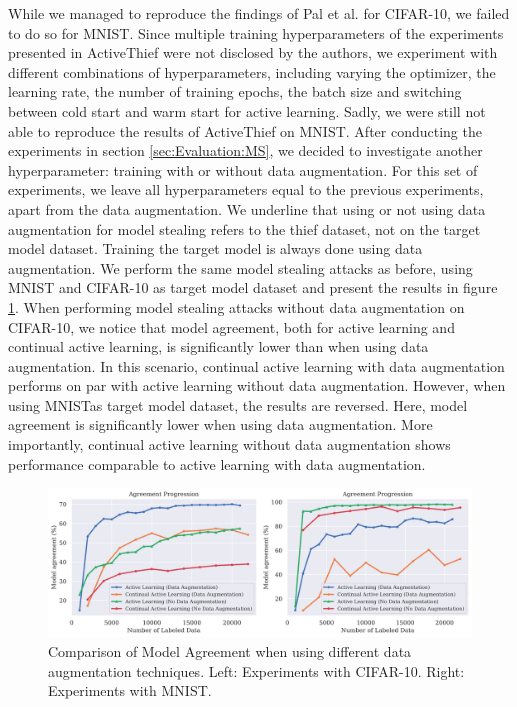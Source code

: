 While we managed to reproduce the findings of Pal et al. for CIFAR-10, we failed to do so for MNIST. Since multiple training hyperparameters of the experiments
presented in ActiveThief were not disclosed by the authors, we experiment with different combinations of hyperparameters, including varying the optimizer,
the learning rate, the number of training epochs, the batch size and switching between cold start and warm start for active learning. Sadly, we were still
not able to reproduce the results of ActiveThief on MNIST. After conducting the experiments in section \ref{sec:Evaluation:MS}, we decided to investigate
another hyperparameter: training with or without data augmentation. For this set of experiments, we leave all hyperparameters equal to the previous experiments,
apart from the data augmentation. We underline that using or not using data augmentation for model stealing refers to the thief dataset, not on the target
model dataset. Training the target model is always done using data augmentation. We perform the same model stealing attacks as before, using MNIST and
CIFAR-10 as target model dataset and present the results in figure \ref{fig:Evaluation:Results:CAL:EffectAugmentation}. When performing model stealing attacks
without data augmentation on CIFAR-10, we notice that model agreement, both for active learning and continual active learning, is significantly lower than
when using data augmentation. In this scenario, continual active learning with data augmentation performs on par with active learning without data augmentation.
However, when using MNISTas target model dataset, the results are reversed. Here, model agreement is significantly lower when using data augmentation.
More importantly, continual active learning without data augmentation shows performance comparable to active learning with data augmentation. \par

\begin{figure}[h]
    \centering
    \includegraphics[width=\linewidth]{images/results_CALMS/effect_data_augmentation.png}
    \caption[Effect of Data Augmentation on the success of Model Stealing Attacks]{Comparison of Model Agreement when using different data augmentation
    techniques. Left: Experiments with CIFAR-10. Right: Experiments with MNIST.}
    \label{fig:Evaluation:Results:CAL:EffectAugmentation}
\end{figure}


